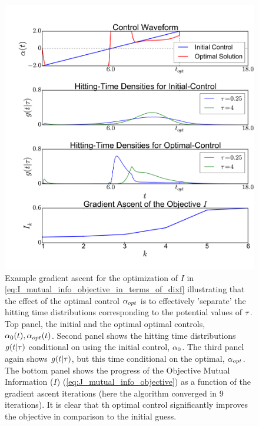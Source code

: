 \documentclass{article}
\begin{document}
\begin{figure}[htp] 
\begin{center}
\includegraphics[width=1\textwidth]{Figs/AdjointOptimizer/GradientAscent_Nt2.pdf}
  \caption[Gradient Ascent for the Optimal Stimulation]{Example gradient
  ascent for the optimization of $I$ in
  \cref{eq:I_mutual_info_objective_in_terms_of_dixf} illustrating that the
  effect of the optimal control ${\alpha}_{opt}$ is to effectively 'separate' the
  hitting time distributions corresponding to the potential values of ${ \tau }$.
  Top
  panel, the initial and the optimal optimal controls, ${\alpha}_{0}(t), {\alpha}_{opt}(t)$. Second panel shows the hitting time distributions $g(t|{ \tau })$ conditional on
  using the initial control, ${\alpha}_0$.
  The third panel again shows $g(t|{ \tau })$, but this time conditional on the
  optimal, ${\alpha}_{opt}$.
 The bottom panel shows the progress of the Objective Mutual Information ($I$) 
  (\cref{eq:J_mutual_info_objective}) as a function of the gradient ascent
  iterations (here the algorithm converged in 9 iterations). It is clear that
  th optimal control significantly improves the objective in comparison to the
  initial guess.}
  \label{fig:example_gradient_ascent}   
\end{center}   
\end{figure}    
 
\end{document}
